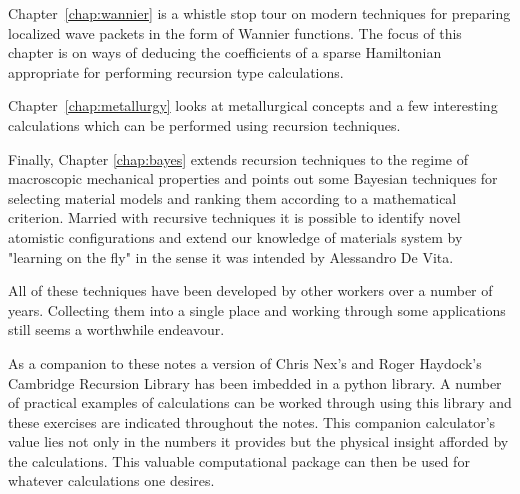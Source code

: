 Chapter~\ref{chap:wannier} is a whistle stop tour 
on modern techniques for preparing localized wave packets in the 
form of Wannier functions. The focus of this chapter is on 
ways of deducing the coefficients of a sparse Hamiltonian
appropriate for performing recursion type calculations.



Chapter~\ref{chap:metallurgy} looks at metallurgical concepts 
and a few interesting calculations which can be performed 
using recursion techniques. 

Finally, Chapter \ref{chap:bayes} extends recursion techniques
to the regime of macroscopic mechanical properties 
and points out some Bayesian techniques 
for selecting material models and ranking them according 
to a mathematical criterion. Married with recursive techniques
it is possible to identify novel atomistic configurations
and extend our knowledge of materials system by "learning on the fly" 
in the sense it was intended by Alessandro De Vita.

All of these techniques have been developed by other workers 
over a number of years. Collecting them into a single place 
and working through some applications still seems a worthwhile 
endeavour. 

As a companion to these notes a version of Chris Nex's and 
Roger Haydock's Cambridge Recursion Library
has been imbedded in a python library. A number of practical examples 
of calculations can be worked through using this library and these 
exercises are indicated throughout the notes. 
This companion calculator's value lies not only
in the numbers it provides but the physical insight afforded by the 
calculations. This valuable computational package can then be used for 
whatever calculations one desires.

